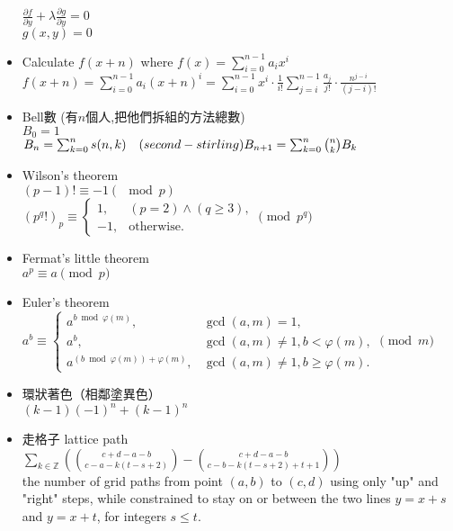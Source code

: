 \begin{itemize}
    $\frac{\partial f}{\partial y} + \lambda\frac{\partial g}{\partial y}=0$\\
    $g(x, y)=0$
  \item Calculate $f(x+n)$ where $f(x)=\sum\limits_{i=0}^{n-1}a_ix^i$\\
    $f(x+n)=\sum\limits_{i=0}^{n-1}a_i(x+n)^i=\sum\limits_{i=0}^{n-1}x^i\cdot\frac{1}{i!}\sum\limits_{j=i}^{n-1}\frac{a_j}{j!}\cdot\frac{n^{j-i}}{(j-i)!}$
  \item Bell數 (有$n$個人,把他們拆組的方法總數)\\
    $B_0= 1$\\
    $B_n= \sum_{k=0}^{n} s(n,k)\quad (second-stirling)\\
    B_{n+1}= \sum_{k=0}^{n}{n \choose k} B_k$
  \item Wilson's theorem\\
    $(p-1)! \equiv -1 (\mod p)$\\
    $(p^q!)_p\equiv \begin{cases} 1, & (p=2) \land (q\geq 3),\\ -1, & \text{otherwise}. \end{cases} \pmod p^q$
  \item Fermat's little theorem\\
    $a^p \equiv a \pmod p$
  \item Euler's theorem\\
    $a^b \equiv \begin{cases} a^{b \bmod \varphi(m)}, &\gcd(a,m) = 1, \\ a^b, &\gcd(a,m)\ne 1, b < \varphi(m), \\ a^{(b \bmod \varphi(m)) + \varphi(m)}, &\gcd(a,m)\ne 1, b \ge \varphi(m). \end{cases} \pmod m$
  \item 環狀著色（相鄰塗異色）\\
      $(k-1)(-1)^n+(k-1)^n$
  \item 走格子 lattice path \\
    $\sum_{k \in \mathbb{Z}} \left( \binom{c+d-a-b}{c-a-k(t-s+2)} - \binom{c+d-a-b}{c-b-k(t-s+2)+t+1} \right)$ \\
    the number of grid paths from point $(a,b)$ to $(c,d)$ using only "up" and "right" steps, while constrained to stay on or between the two lines $y=x+s$ and $y=x+t$, for integers $s \le t$.
  
\end{itemize}
